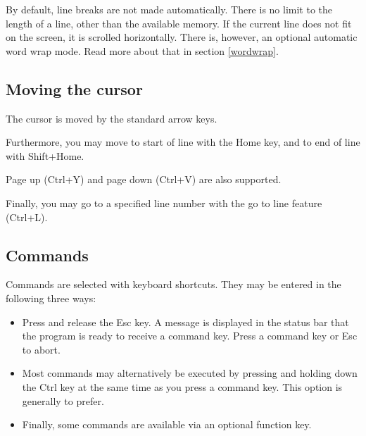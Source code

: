 \documentclass{article}
\begin{document}
        By default, line breaks are not made automatically. There is no limit
        to the length of a line, other than the available memory. If 
        the current line does not fit on the screen, it is 
        scrolled horizontally. There is, however, an optional automatic 
        word wrap mode. Read more about that in section \ref{wordwrap}.
       
    \subsection{Moving the cursor}

        The cursor is moved by the standard arrow keys.

        Furthermore, you may move to start of line with the Home key, and to end of line with Shift+Home.

        Page up (Ctrl+Y) and page down (Ctrl+V) are also supported.

        Finally, you may go to a specified line number with the go to line feature (Ctrl+L).

    \subsection{Commands}
    \label{commands}
    
        Commands are selected with keyboard shortcuts. They may be entered in the following three ways:

        \begin{itemize}
            \item Press and release the Esc key. A message is displayed in the status bar that the program is ready to receive a command key.
            Press a command key or Esc to abort.

            \item Most commands may alternatively be executed by pressing and holding down the Ctrl key at the same time as you press a command key. 
            This option is generally to prefer.
            
            \item Finally, some commands are available via an optional function key.
        \end{itemize}
\end{document}
